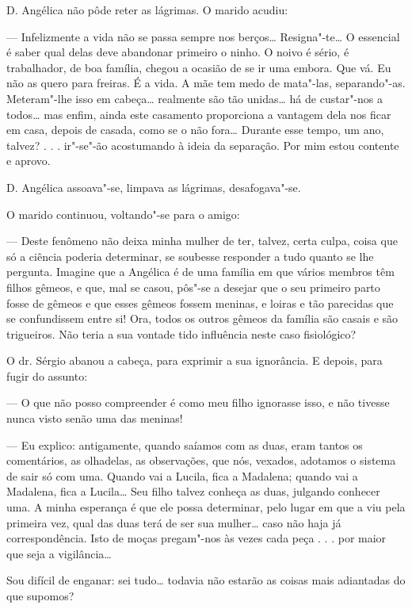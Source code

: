 D. Angélica não pôde reter as lágrimas. O marido acudiu:

--- Infelizmente a vida não se passa sempre nos berços\ldots{} Resigna"-te\ldots{}
O essencial é saber qual delas deve abandonar primeiro o ninho. O noivo
é sério, é trabalhador, de boa família, chegou a ocasião de se ir uma
embora. Que vá. Eu não as quero para freiras. É a vida. A mãe tem medo
de mata"-las, separando"-as. Meteram"-lhe isso em cabeça\ldots{} realmente são
tão unidas\ldots{} há de custar"-nos a todos\ldots{} mas enfim, ainda este
casamento proporciona a vantagem dela nos ficar em casa, depois de
casada, como se o não fora\ldots{} Durante esse tempo, um ano, talvez? . . .
ir"-se"-ão acostumando à ideia da separação. Por mim estou contente e
aprovo.

D. Angélica assoava"-se, limpava as lágrimas, desafogava"-se.

O marido continuou, voltando"-se para o amigo:

--- Deste fenômeno não deixa minha mulher de ter, talvez, certa culpa,
coisa que só a ciência poderia determinar, se soubesse responder a tudo
quanto se lhe pergunta. Imagine que a Angélica é de uma família em que
vários membros têm filhos gêmeos, e que, mal se casou, pôs"-se a desejar
que o seu primeiro parto fosse de gêmeos e que esses gêmeos fossem
meninas, e loiras e tão parecidas que se confundissem entre si! Ora,
todos os outros gêmeos da família são casais e são trigueiros. Não teria
a sua vontade tido influência neste caso fisiológico?

O dr. Sérgio abanou a cabeça, para exprimir a sua ignorância. E depois,
para fugir do assunto:

--- O que não posso compreender é como meu filho ignorasse isso, e não
tivesse nunca visto senão uma das meninas!

--- Eu explico: antigamente, quando saíamos com as duas, eram tantos os
comentários, as olhadelas, as observações, que nós, vexados, adotamos o
sistema de sair só com uma. Quando vai a Lucila, fica a Madalena; quando
vai a Madalena, fica a Lucila\ldots{} Seu filho talvez conheça as duas,
julgando conhecer uma. A minha esperança é que ele possa determinar,
pelo lugar em que a viu pela primeira vez, qual das duas terá de ser sua
mulher\ldots{} caso não haja já correspondência. Isto de moças pregam"-nos às
vezes cada peça . . . por maior que seja a vigilância\ldots{}

Sou difícil de enganar: sei tudo\ldots{} todavia não estarão as coisas mais
adiantadas do que supomos?

